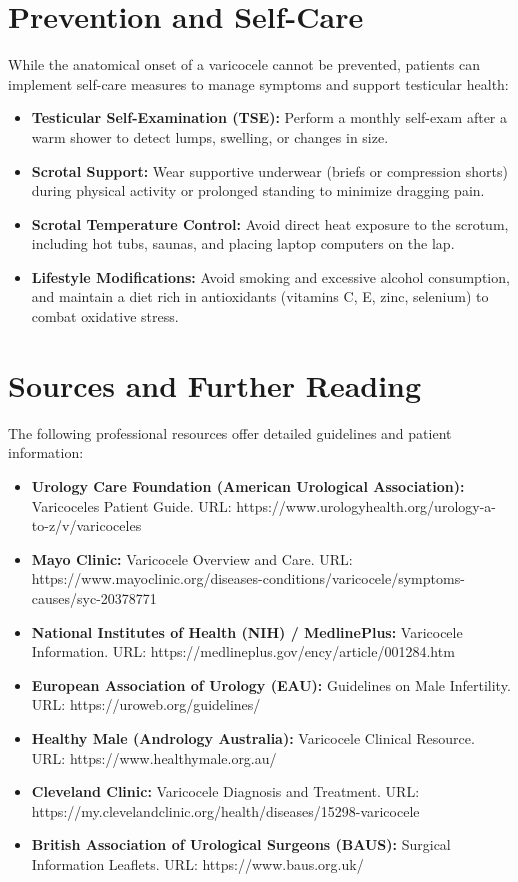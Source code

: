 \section*{Prevention and Self-Care}
While the anatomical onset of a varicocele cannot be prevented, patients can implement self-care measures to manage symptoms and support testicular health:
\begin{itemize}
  \item \textbf{Testicular Self-Examination (TSE):} Perform a monthly self-exam after a warm shower to detect lumps, swelling, or changes in size.
  \item \textbf{Scrotal Support:} Wear supportive underwear (briefs or compression shorts) during physical activity or prolonged standing to minimize dragging pain.
  \item \textbf{Scrotal Temperature Control:} Avoid direct heat exposure to the scrotum, including hot tubs, saunas, and placing laptop computers on the lap.
  \item \textbf{Lifestyle Modifications:} Avoid smoking and excessive alcohol consumption, and maintain a diet rich in antioxidants (vitamins C, E, zinc, selenium) to combat oxidative stress.
\end{itemize}

\section*{Sources and Further Reading}
The following professional resources offer detailed guidelines and patient information:
\begin{itemize}
  \item \textbf{Urology Care Foundation (American Urological Association):} Varicoceles Patient Guide. URL: https://www.urologyhealth.org/urology-a-to-z/v/varicoceles
  \item \textbf{Mayo Clinic:} Varicocele Overview and Care. URL: https://www.mayoclinic.org/diseases-conditions/varicocele/symptoms-causes/syc-20378771
  \item \textbf{National Institutes of Health (NIH) / MedlinePlus:} Varicocele Information. URL: https://medlineplus.gov/ency/article/001284.htm
  \item \textbf{European Association of Urology (EAU):} Guidelines on Male Infertility. URL: https://uroweb.org/guidelines/
  \item \textbf{Healthy Male (Andrology Australia):} Varicocele Clinical Resource. URL: https://www.healthymale.org.au/
  \item \textbf{Cleveland Clinic:} Varicocele Diagnosis and Treatment. URL: https://my.clevelandclinic.org/health/diseases/15298-varicocele
  \item \textbf{British Association of Urological Surgeons (BAUS):} Surgical Information Leaflets. URL: https://www.baus.org.uk/
\end{itemize}